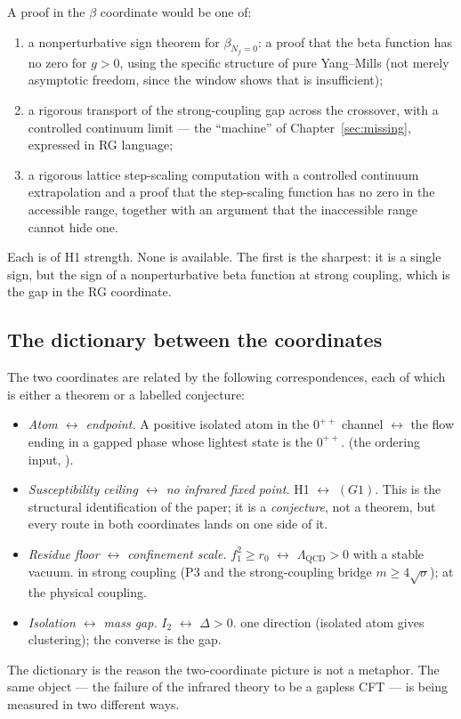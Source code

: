 A proof in the $\beta$ coordinate would be one of:
\begin{enumerate}
\item a nonperturbative sign theorem for $\beta_{N_f=0}$: a proof that the beta function has no
  zero for $g>0$, using the specific structure of pure Yang--Mills (not merely asymptotic
  freedom, since the window shows that is insufficient);
\item a rigorous transport of the strong-coupling gap across the crossover, with a controlled
  continuum limit --- the ``machine'' of Chapter~\ref{sec:missing}, expressed in RG language;
\item a rigorous lattice step-scaling computation with a controlled continuum extrapolation and
  a proof that the step-scaling function has no zero in the accessible range, together with an
  argument that the inaccessible range cannot hide one.
\end{enumerate}
Each is of H1 strength. None is available. The first is the sharpest: it is a single sign, but
the sign of a nonperturbative beta function at strong coupling, which is the gap in the RG
coordinate.

\subsection{The dictionary between the coordinates}

The two coordinates are related by the following correspondences, each of which is either a
theorem or a labelled conjecture:
\begin{itemize}
\item \emph{Atom $\leftrightarrow$ endpoint.} A positive isolated atom in the $0^{++}$ channel
  $\leftrightarrow$ the flow ending in a gapped phase whose lightest state is the $0^{++}$.
  \LC{} (the ordering input, ).
\item \emph{Susceptibility ceiling $\leftrightarrow$ no infrared fixed point.} H1
  $\leftrightarrow$ $(G1)$. This is the structural identification of the paper; it is a
  \emph{conjecture}, not a theorem, but every route in both coordinates lands on one side of it.
\item \emph{Residue floor $\leftrightarrow$ confinement scale.} $f_1^2\ge r_0$ $\leftrightarrow$
  $\Lambda_{\mathrm{QCD}}>0$ with a stable vacuum. \LT{} in strong coupling (P3 and the
  strong-coupling bridge $m\ge4\sqrt\sigma$); \LM{} at the physical coupling.
\item \emph{Isolation $\leftrightarrow$ mass gap.} $I_2$ $\leftrightarrow$ $\Delta>0$. \LT{}
  one direction (isolated atom gives clustering); the converse is the gap.
\end{itemize}
The dictionary is the reason the two-coordinate picture is not a metaphor. The same object ---
the failure of the infrared theory to be a gapless CFT --- is being measured in two different
ways.

